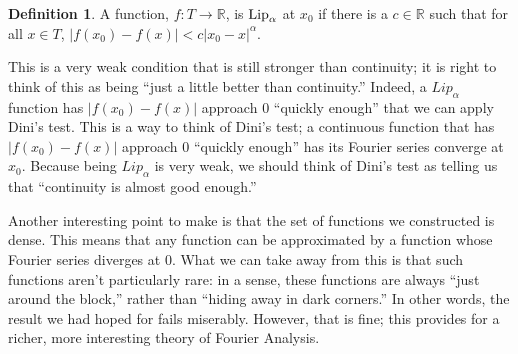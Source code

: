 \documentclass{amsart}
\newcommand{\al}{\alpha} %
\newcommand{\R}{\mathbb{R}}
\newcommand{\Lip}{\text{\rm Lip}}
\newcommand{\absval}[1]{\left| #1 \right|}
\theoremstyle{definition}
\newtheorem{definition}[thm]{Definition}
\begin{document}
\begin{definition}
A function, $f: T \to \R$, is $\Lip_\al$ at $x_0$ if there is a $c \in \R$ such that for all $x \in T$, $\absval{f(x_0) - f(x)} < c\absval{x_0-x}^\al$. 
\end{definition}

This is a very weak condition that is still stronger than continuity; it is right to think of this as being ``just a little better than continuity.''
Indeed, a $Lip_\al$ function has $\absval{f(x_0) - f(x)}$ approach $0$ ``quickly enough'' that we can apply Dini's test.
This is a way to think of Dini's test; a continuous function that has $\absval{f(x_0) - f(x)}$ approach $0$ ``quickly enough'' has its Fourier series converge at $x_0$. 
Because being $Lip_\al$ is very weak, we should think of Dini's test as telling us that ``continuity is almost good enough.''


Another interesting point to make is that the set of functions we constructed is dense. 
This means that any function can be approximated by a function whose Fourier series diverges at $0$. 
What we can take away from this is that such functions aren't particularly rare: in a sense, these functions are always ``just around the block,'' rather than ``hiding away in dark corners.''
In other words, the result we had hoped for fails miserably. 
However, that is fine; this provides for a richer, more interesting theory of Fourier Analysis.
\end{document}
